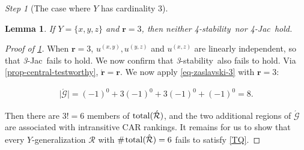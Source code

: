 \documentclass[ecta,nameyear,draft]{econsocart}
\makeatletter
\newcommand{\countof}{\mathbin{\#}\hskip1pt}
\newcommand{\mc}{\mathcal}
\newcommand\mpplus{\text{\srcsize$+\mkern-2mu+$}}
\newcommand{\hext}{\mathrel{\hat{\mathrel{\mathcal R}}}}
\newcommand{\aext}{\mathrel{\acute{\mathrel{\mathcal R}}}}
\newcommand{\total}{\textup{total}}
\newcommand{\xy}{{(x, y)}}
\newcommand{\yz}{{(y,z)}}
\newcommand{\xz}{{(x,z)}}
\newcommand{\stability}{\textit{4}-\textup{{stability}}}
\newcommand{\threepru}{\textit{3}-\textup{{stability}}}
\newcommand{\fourjac}{\textup{\textit{4}-Jac}}
\newcommand{\threejac}{\textup{\textit{3}-Jac}}
\newcommand{\srcsize}{\@setfontsize{\srcsize}{3pt}{3pt}}
\theoremstyle{plain}
\newtheorem{lemma}{Lemma}[theorem]
\theoremstyle{remark}
\newtheorem{step}{Step}[section]
\makeatother
\begin{document}
\begin{appendix}
\begin{step}[The case where $Y$ has cardinality $3$]
    \begin{lemma}\label{lem-Y3-r3} If $Y = \{x,y,z\}$ and $\mathbf{r} = 3$, then
      neither \stability\ nor \fourjac\ hold.
    \end{lemma}
    \begin{proof}[Proof of \cref{lem-Y3-r3}] When $\mathbf r = 3$, $u^{\xy},
      u^{\yz}$ and $u^{\xz}$ are linearly independent, so that \threejac\ fails
      to hold. We now confirm that \threepru\ also fails to hold.  Via
      \cref{prop-central-testworthy}, $\acute{\mathbf r} = \mathbf r$. We now
      apply \cref{eq-zaslavski-3} with $\mathbf{r}=3$:
      \begin{linenomath*}
        \begin{align*}
          \lvert \acute{\mc G}\rvert = (-1)^{0}+3(-1)^{0}+ 3(-1)^{0}+(-1)^{0} =
          8.
        \end{align*}
      \end{linenomath*}
      Then there are $3!=6$ members of $\total (\aext)$, and the two additional
      regions of $\acute {\mc G}$ are associated with intransitive CAR rankings.
      It remains for us to show that every $Y$-generalization $\hext$ with
      $\countof \total (\hext) = 6$ fails to satisfy \ref{TQ}.



\end{proof}
\end{step}
\end{appendix}
\end{document}
